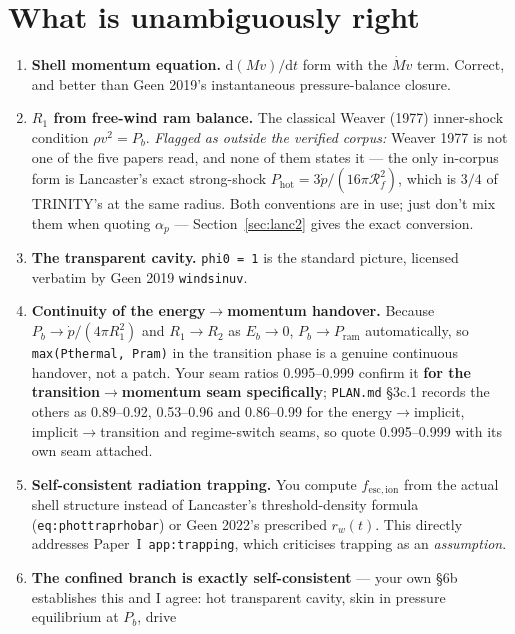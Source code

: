 \documentclass[11pt,a4paper,oneside]{report}
\newcommand{\brkus}{\textunderscore\allowbreak}
\newcommand{\code}[1]{\texttt{\small\let\_\brkus #1}}
\newcommand{\lbl}[1]{\texttt{\footnotesize\let\_\brkus #1}}
\newcommand{\PI}{Paper~I}
\newcommand{\Rf}{\mathcal{R}_{f}}
\newcommand{\pdotw}{\dot p}
\newcommand{\ap}{\alpha_p}
\newcommand{\Pb}{P_{b}}
\newcommand{\Pram}{P_{\mathrm{ram}}}
\newcommand{\up}[1]{\textcolor{tqaccent}{\textbf{#1}}}
\begin{document}
\section{What is unambiguously right}

\begin{enumerate}
\item \textbf{Shell momentum equation.} $\mathrm{d}(Mv)/\mathrm{d}t$ form with the
      $\dot M v$ term. Correct, and better than Geen 2019's instantaneous pressure-balance
      closure.
\item \textbf{$R_1$ from free-wind ram balance.} The classical Weaver (1977) inner-shock condition
      $\rho v^2 = \Pb$. \emph{Flagged as outside the verified corpus:} Weaver 1977 is not one of the
      five papers read, and none of them states it --- the only in-corpus form is Lancaster's exact
      strong-shock $P_{\mathrm{hot}}=3\pdotw/(16\pi\Rf^2)$, which is $3/4$ of TRINITY's at the same
      radius. Both conventions are in use; just don't mix them when quoting $\ap$ ---
      Section~\ref{sec:lanc2} gives the exact conversion.
\item \textbf{The transparent cavity.} \code{phi0 = 1} is the standard picture, licensed
      verbatim by Geen 2019 \lbl{winds\_in\_uv}.
\item \textbf{Continuity of the energy$\to$momentum handover.} Because
      $\Pb\to\pdotw/(4\pi R_1^2)$ and $R_1\to R_2$ as $E_b\to0$, $\Pb\to\Pram$
      automatically, so \code{max(P\_thermal, P\_ram)} in the transition phase is a genuine
      continuous handover, not a patch. Your seam ratios 0.995--0.999 confirm it
      \up{for the transition$\to$momentum seam specifically}; \code{PLAN.md} \S3c.1 records
      the others as 0.89--0.92, 0.53--0.96 and 0.86--0.99 for the energy$\to$implicit,
      implicit$\to$transition and regime-switch seams, so quote 0.995--0.999 with its
      own seam attached.
\item \textbf{Self-consistent radiation trapping.} You compute $f_{\mathrm{esc,ion}}$ from
      the actual shell structure instead of Lancaster's threshold-density formula
      (\lbl{eq:phot\_trap\_rhobar}) or Geen 2022's prescribed $r_w(t)$. This directly
      addresses \PI\ \lbl{app:trapping}, which criticises trapping as an \emph{assumption}.
\item \textbf{The confined branch is exactly self-consistent} --- your own \S6b establishes
      this and I agree: hot transparent cavity, skin in pressure equilibrium at $\Pb$, drive

\end{enumerate}
\end{document}
